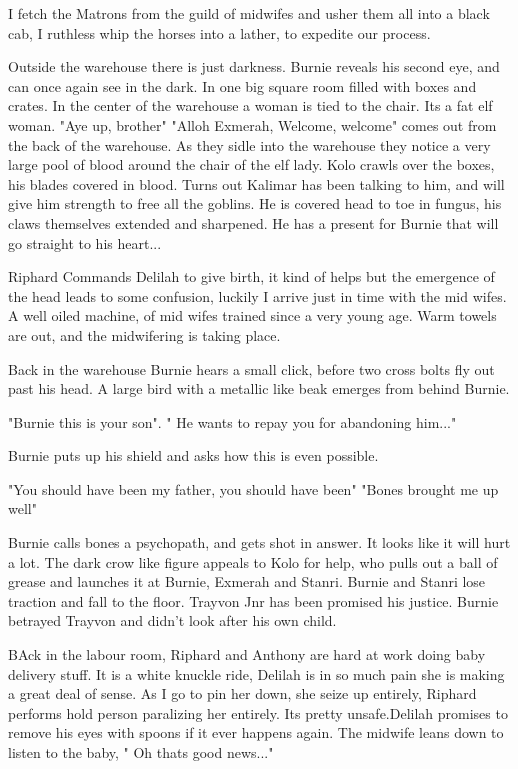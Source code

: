 I fetch the Matrons from the guild of midwifes and usher them all into a black cab, I ruthless whip the horses into a lather, to expedite our process.\medskip

Outside the warehouse there is just darkness. Burnie reveals his second eye, and can once again see in the dark. In one big square room filled with boxes and crates. In the center of the warehouse a woman is tied to the chair. Its a fat elf woman. "Aye up, brother" "Alloh Exmerah, Welcome, welcome" comes out from the back of the warehouse. As they sidle into the warehouse they notice a very large pool of blood around the chair of the elf lady. Kolo crawls over the boxes, his blades covered in blood. Turns out Kalimar has been talking to him, and will give him strength to free all the goblins. He is covered head to toe in fungus, his claws themselves extended and sharpened. He has a present for Burnie that will go straight to his heart...\medskip

Riphard Commands Delilah to give birth, it kind of helps but the emergence of the head leads to some confusion, luckily I arrive just in time with the mid wifes. A well oiled machine, of mid wifes trained since a very young age. Warm towels are out, and the midwifering is taking place.\medskip

Back in the warehouse Burnie hears a small click, before two cross bolts fly out past his head. A large bird with a metallic like beak emerges from behind Burnie.\medskip

"Burnie this is your son". " He wants to repay you for abandoning him..."\medskip

Burnie puts up his shield and asks how this is even possible.\medskip

"You should have been my father, you should have been" "Bones brought me up well"\medskip

Burnie calls bones a psychopath, and gets shot in answer. It looks like it will hurt a lot. The dark crow like figure appeals to Kolo for help, who pulls out a ball of grease and launches it at Burnie, Exmerah and Stanri. Burnie and Stanri lose traction and fall to the floor. Trayvon Jnr has been promised his justice. Burnie betrayed Trayvon and didn't look after his own child.\medskip

BAck in the labour room, Riphard and Anthony are hard at work doing baby delivery stuff. It is a white knuckle ride, Delilah is in so much pain she is making a great deal of sense. As I go to pin her down, she seize up entirely, Riphard performs hold person paralizing her entirely. Its pretty unsafe.Delilah promises to remove his eyes with spoons if it ever happens again. The midwife leans down to listen to the baby, " Oh thats good news..."\medskip

